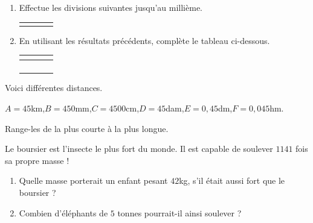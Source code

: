 \documentclass[a4paper,10pt]{report}
\begin{document}
\begin{ex}

\medskip
\begin{enumerate}
\item Effectue les divisions suivantes jusqu'au millième.
\begin{enumerate}
\renewcommand{\arraystretch}{0.5}
\begin{tabularx}{\linewidth}{*{4}{>{\arraybackslash}X}}
\item $85 \div 6$ &
\item $10 \div 11$ &
\item $12 \div 7$ &
\item $51 \div 21$ \\
\end{tabularx}
\end{enumerate}

\item En utilisant les résultats précédents, complète  le tableau ci-dessous.
\begin{center}
\renewcommand{\arraystretch}{1.5}
\begin{tabularx}{\linewidth}{|p{0.5cm}|*{3}{>{\centering \arraybackslash}X|}}
\cline{2-4}
\multicolumn{1}{c|}{} & \cellcolor{exer2!20}{Arrondi à l'unité près} & \cellcolor{exer2!20}{Arrondi au dixième près} & \cellcolor{exer2!20}{Arrondi au centième près} \\\hline
\cellcolor{exer2!20}{a.} & & & \\\hline
\cellcolor{exer2!20}{b.} & & & \\\hline
\cellcolor{exer2!20}{c.} & & & \\\hline
\cellcolor{exer2!20}{d.} & & & \\\hline
\end{tabularx}
\end{center}		
\end{enumerate}
\end{ex}

\begin{ex}
Voici différentes distances.

\begin{center}
$A=45$km,\quad $B=450$mm,\quad $C=4500$cm,\quad $D=45$dam,\quad $E=0,45$dm,\quad $F=0,045$hm.
\end{center}

\noindent Range-les de la plus courte à la plus longue.
\end{ex}

\begin{ex}
Le boursier est l'insecte le plus fort du monde. Il est capable de soulever $1 141$ fois sa propre masse !
\begin{enumerate}
\item Quelle masse porterait un enfant pesant $42$kg, s'il était aussi fort que le boursier ?
\item Combien d'éléphants de $5$ tonnes pourrait-il ainsi soulever ?
\end{enumerate}
\end{ex}
\end{document}
